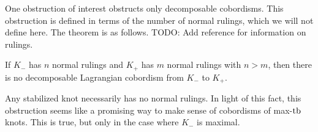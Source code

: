 One obstruction of interest obstructs only decomposable cobordisms. This obstruction is defined in terms of the number of normal rulings, which we will not define here. The theorem is as follows.
TODO: Add reference for information on rulings.
\begin{theorem}
    If $K_-$ has $n$ normal rulings and $K_+$ has $m$ normal rulings with $n > m$, then there is no decomposable Lagrangian cobordism from $K_-$ to $K_+$.
\end{theorem}
Any stabilized knot necessarily has no normal rulings. In light of this fact, this obstruction seems like a promising way to make sense of cobordisms of max-$\operatorname{tb}$ knots. This is true, but only in the case where $K_-$ is maximal.

